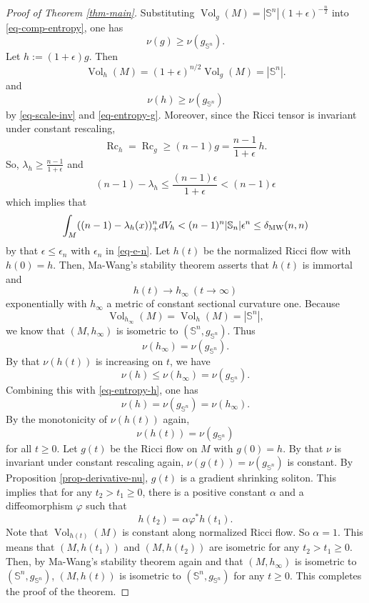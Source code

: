 \documentclass[12pt]{amsart}
\def\sph{\mathbb{S}}
\def\e{\epsilon}
\theoremstyle{definition}
\theoremstyle{remark}
\numberwithin{equation}{section}
\begin{document}
\begin{proof}[Proof of Theorem \ref{thm-main}]
Substituting $\operatorname{Vol}_g(M)=|\sph^n|(1+\e)^{-\frac{n}{2}}$ into  \eqref{eq-comp-entropy}, one has
\begin{equation}\label{eq-entropy-g}
\nu(g)\geq \nu(g_{\sph^n}).
\end{equation}
Let \(h := (1+\epsilon)g\). Then
\[
\operatorname{Vol}_h(M) = (1+\epsilon)^{n/2} \operatorname{Vol}_g(M) = |\mathbb{S}^n|.
\]
and 
\begin{equation}\label{eq-entropy-h}
\nu(h)\geq \nu(g_{\sph^n})
\end{equation}
by \eqref{eq-scale-inv} and \eqref{eq-entropy-g}. Moreover, since the Ricci tensor is invariant under constant rescaling,
\[
\operatorname{Rc}_h = \operatorname{Rc}_g \ge (n-1)g = \frac{n-1}{1+\epsilon}\,h.
\]
So, $\lambda_h\geq \frac{n-1}{1+\epsilon}$ and 
$$(n-1)-\lambda_h\leq \frac{(n-1)\e}{1+\e}<(n-1)\e$$
which implies that 
$$\int_M((n-1)-\lambda_h(x))_+^ndV_h<(n-1)^n|\sph_n|\e^n\leq \delta_{\rm MW}(n,n)$$
by that $\e\leq\e_n$ with $\e_n$ in \eqref{eq-e-n}. Let $h(t)$ be the normalized Ricci flow with $h(0)=h$. Then, Ma-Wang's stability theorem asserts that $h(t)$ is immortal and 
$$h(t)\to h_\infty\ (t\to\infty)$$
exponentially with $h_\infty$ a metric of constant sectional curvature one. Because $$\operatorname{Vol}_{h_\infty}(M)=\operatorname{Vol}_h(M)=|\sph^n|,$$
we know that $(M,h_\infty)$ is isometric to $(\sph^n,g_{\sph^n})$. Thus 
$$\nu(h_\infty)=\nu(g_{\sph^n}).$$
By that $\nu(h(t))$ is increasing on $t$, we have 
$$\nu(h)\leq \nu(h_\infty)=\nu(g_{\sph^n}).$$ 
Combining this with \eqref{eq-entropy-h}, one has 
$$\nu(h)=\nu(g_{\sph^n})=\nu(h_\infty).$$
By the monotonicity of $\nu(h(t))$ again,
$$\nu(h(t))=\nu(g_{\sph^n})$$
for all $t\geq 0$. Let $g(t)$ be the Ricci flow on $M$ with $g(0)=h$. By that $\nu$ is invariant under constant rescaling again, $\nu(g(t))=\nu(g_{\sph^n})$ is constant. By Proposition \ref{prop-derivative-nu}, $g(t)$ is a gradient shrinking soliton. This implies that for any $t_2>t_1\geq 0$, there is a positive constant $\alpha$ and a diffeomorphism $\varphi$ such that 
$$h(t_2)=\alpha \varphi^*h(t_1).$$
Note that $\operatorname{Vol}_{h(t)}(M)$ is constant along normalized Ricci flow. So $\alpha=1$. This means that $(M,h(t_1))$ and $(M,h(t_2))$ are isometric for any $t_2>t_1\geq0$. Then, by Ma-Wang's stability theorem again and that $(M,h_\infty)$ is isometric to $(\sph^n,g_{\sph^n})$, $(M,h(t))$ is isometric to $(\sph^n,g_{\sph^n})$ for any $t\geq 0$. This completes the proof of the theorem. 
\end{proof}
\end{document}
